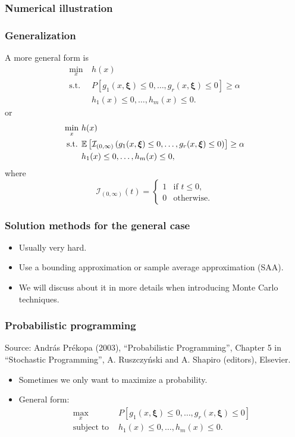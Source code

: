 \documentclass{beamer}
\def\bxi{\boldsymbol\xi}
\begin{document}
\begin{frame}
\frametitle{Numerical illustration}

\frametitle{Generalization}

A more general form is
\begin{align*}
	\min_x \ & h(x) \\
	\text{s.t. } & P[ g_1(x, \bxi) \leq 0,\ldots, g_r(x, \bxi) \leq 0] \geq \alpha \\
	& h_1(x) \leq 0,\ldots, h_m(x) \leq 0.
\end{align*}
or
\begin{align*}
	\min_x \ & h(x) \\
	\text{s.t. } & \EE\left[ \mathcal{I}_{(0,\infty)} \left( g_1(x, \bxi) \leq 0,\ldots, g_r(x, \bxi) \leq 0 \right) \right] \geq \alpha \\
	& h_1(x) \leq 0,\ldots, h_m(x) \leq 0,
\end{align*}
where
$$
\mathcal{I}_{(0,\infty)}(t) =
\begin{cases}
	1 & \mbox{if } t \leq 0,\\
	0 & \mbox{otherwise}.
\end{cases}
$$

\end{frame}

\begin{frame}
\frametitle{Solution methods for the general case}

\begin{itemize}
\item	
Usually very hard.
\item
Use a bounding approximation or sample average approximation (SAA).
\item
We will discuss about it in more details when introducing Monte Carlo techniques.
\end{itemize}

\end{frame}

\begin{frame}
\frametitle{Probabilistic programming}

Source: András Prékopa (2003), ``Probabilistic Programming'', Chapter 5 in ``Stochastic Programming'', A. Ruszczy\'nski and A. Shapiro (editors), Elsevier.

\mbox{}

\begin{itemize}
	\item 
Sometimes we only want to maximize a probability.
\item
General form:
\begin{align*}
\max_x \ & P[ g_1(x, \bxi) \leq 0,\ldots, g_r(x, \bxi) \leq 0] \\
\text{subject to } & h_1(x) \leq 0,\ldots, h_m(x) \leq 0.
\end{align*}
\end{itemize}

\end{frame}
\end{document}
